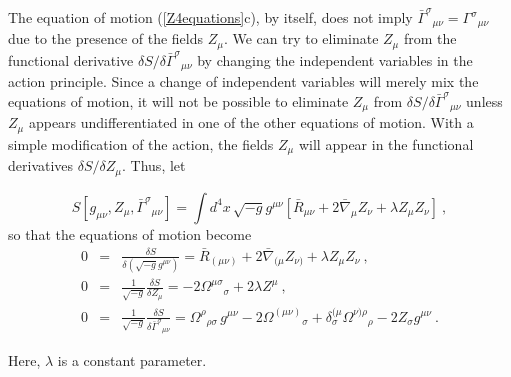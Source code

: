 \documentclass[letterpaper,nofootinbib,prd,amsmath,twocolumn]{revtex4-1}
\begin{document}
The equation of motion (\ref{Z4equations}c), by itself, does not imply 
$\bar\Gamma^\sigma{}_{\mu\nu} = \Gamma^\sigma{}_{\mu\nu}$ due to the presence of the fields $Z_\mu$. We can 
try to eliminate $Z_\mu$ from the functional derivative $\delta S/\delta \bar\Gamma^{\sigma}{}_{\mu\nu}$ by changing the 
independent variables in the action principle. Since a change of independent variables will merely mix 
the equations of motion, 
it will not be possible to eliminate $Z_\mu$ from $\delta S/\delta \bar\Gamma^{\sigma}{}_{\mu\nu}$ unless $Z_\mu$ appears 
undifferentiated in one of the other equations of motion. With a simple modification of the action, the fields $Z_\mu$ 
will appear in the functional derivatives  $\delta S/\delta Z_\mu$. Thus, let
\begin{widetext}
\begin{equation}\label{Z4action2}
  S[g_{\mu\nu},Z_\mu,\bar\Gamma^\sigma{}_{\mu\nu}] = \int d^4x \, \sqrt{-g} g^{\mu\nu} \left[ \bar R_{\mu\nu}
   + 2\bar\nabla_\mu Z_\nu  + \lambda Z_\mu Z_\nu \right] \ ,
\end{equation}
so that the equations of motion become 
\begin{subequations}\label{Z4equations2}
  \begin{eqnarray}
   0 & = & \frac{\delta S}{\delta(\sqrt{-g} g^{\mu\nu})} = \bar R_{(\mu\nu)} + 2\bar\nabla_{(\mu} Z_{\nu)} 
	+ \lambda Z_\mu Z_\nu  \ ,\\
   0 & = & \frac{1}{\sqrt{-g}}\frac{\delta S}{\delta Z_\mu} = -2 \Omega^{\mu\sigma}{}_\sigma 
	+ 2\lambda Z^\mu  \ ,\\
   0 & = & \frac{1}{\sqrt{-g}}\frac{\delta S}{\delta \bar\Gamma^\sigma{}_{\mu\nu}} = \Omega^\rho{}_{\rho\sigma} \, g^{\mu\nu} 
       - 2\Omega^{(\mu\nu)}{}_\sigma + \delta^{(\mu}_\sigma \Omega^{\nu)\rho}{}_\rho - 2 Z_\sigma g^{\mu\nu} \ .
\end{eqnarray}
\end{subequations}
\end{widetext}
Here, $\lambda$ is a constant parameter. 
\end{document}
